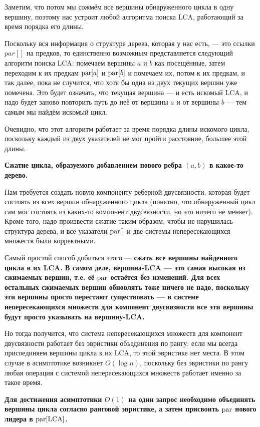 {Заметим, что потом мы сожмём все вершины обнаруженного цикла в одну вершину, поэтому нас устроит любой алгоритма поиска LCA, работающий за время порядка его длины.

Поскольку вся информация о структуре дерева, которая у нас есть, --- это ссылки $par[]$ на предков, то единственно возможным представляется следующий алгоритм поиска LCA: помечаем вершины $a$ и $b$ как посещённые, затем переходим к их предкам ${\rm par}[a]$ и ${\rm par}[b]$ и помечаем их, потом к их предкам, и так далее, пока не случится, что хотя бы одна из двух текущих вершин уже помечена. Это будет означать, что текущая вершина --- и есть искомый LCA, и надо будет заново повторить путь до неё от вершины $a$ и от вершины $b$ --- тем самым мы найдём искомый цикл.

Очевидно, что этот алгоритм работает за время порядка длины искомого цикла, поскольку каждый из двух указателей не мог пройти расстояние, большее этой длины.

\li \bf{Сжатие цикла}, образуемого добавлением нового ребра $(a,b)$ в какое-то дерево.

Нам требуется создать новую компоненту рёберной двусвязности, которая будет состоять из всех вершин обнаруженного цикла (понятно, что обнаруженный цикл сам мог состоять из каких-то компонент двусвязности, но это ничего не меняет). Кроме того, надо произвести сжатие таким образом, чтобы не нарушилась структура дерева, и все указатели ${\rm par}[]$ и две системы непересекающихся множеств были корректными.

Самый простой способ добиться этого --- \bf{сжать все вершины найденного цикла в их LCA}. В самом деле, вершина-LCA --- это самая высокая из сжимаемых вершин, т.е. её ${\rm par}$ остаётся без изменений. Для всех остальных сжимаемых вершин обновлять тоже ничего не надо, поскольку эти вершины просто перестают существовать --- в системе непересекающихся множеств для компонент двусвязности все эти вершины будут просто указывать на вершину-LCA.

Но тогда получится, что система непересекающихся множеств для компонент двусвязности работает без эвристики объединения по рангу: если мы всегда присоединяем вершины цикла к их LCA, то этой эвристике нет места. В этом случае в асимптотике возникнет $O(\log n)$, поскольку без эвристики по рангу любая операция с системой непересекающихся множеств работает именно за такое время.

\bf{Для достижения асимптотики $O(1)$} на один запрос необходимо объединять вершины цикла согласно ранговой эвристике, а затем присвоить ${\rm par}$ нового лидера в ${\rm par}[{\rm LCA}]$.

}



